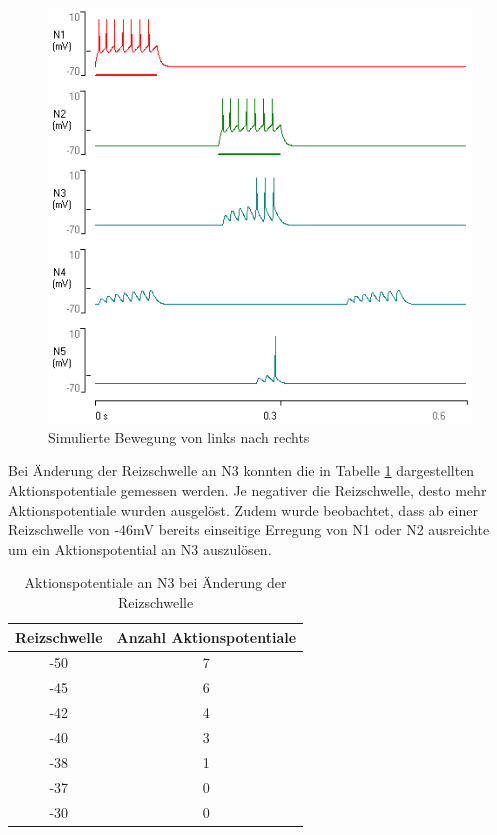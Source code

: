 \documentclass[a4paper]{article}
\begin{document}
\begin{figure}[H]
    \centering
    \includegraphics[scale=0.7]{images/Aufgabe4_2_linksRechts.png}
    \caption{Simulierte Bewegung von links nach rechts}
    \label{fig:A4_2_linksRechts}
\end{figure}

\newpage
\noindent Bei Änderung der Reizschwelle an N3 konnten die in Tabelle \ref{tab:A4_4c} dargestellten Aktionspotentiale gemessen werden. Je negativer die Reizschwelle, desto mehr Aktionspotentiale wurden ausgelöst. Zudem wurde beobachtet, dass ab einer Reizschwelle von -46mV bereits einseitige Erregung von N1 oder N2 ausreichte um ein Aktionspotential an N3 auszulösen. \vspace{1}

\begin{table}[H]
    \centering
    \caption{Aktionspotentiale an N3 bei Änderung der Reizschwelle}
    \begin{tabular}{c|c}
         Reizschwelle & Anzahl Aktionspotentiale  \\
         \hline
         -50 & 7\\
         -45 & 6\\
         -42 & 4\\
         -40 & 3\\
         -38 & 1\\
         -37 & 0\\
         -30 & 0
    \end{tabular}
    \label{tab:A4_4c}
\end{table}
\end{document}
